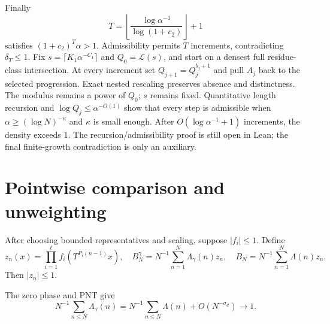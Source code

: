 Finally
\[
 T=\left\lfloor\frac{\log\alpha^{-1}}{\log(1+c_2)}\right\rfloor+1
\]
satisfies $(1+c_2)^T\alpha>1$. Admissibility permits $T$ increments, contradicting $\delta_T\leq1$.
\else
Fix $s=\lceil K_1\alpha^{-C_1}\rceil$ and $Q_0=\mathcal L(s)$, and start on a densest full residue-class intersection. At every increment set $Q_{j+1}=Q_j^{b_j+1}$ and pull $A_j$ back to the selected progression. Exact nested rescaling preserves absence and distinctness. The modulus remains a power of $Q_0$; $s$ remains fixed. Quantitative length recursion and $\log Q_j\leq\alpha^{-O(1)}$ show that every step is admissible when $\alpha\geq(\log N)^{-\kappa}$ and $\kappa$ is small enough. After $O(\log\alpha^{-1}+1)$ increments, the density exceeds $1$. The recursion/admissibility proof is still open in Lean; the final finite-growth contradiction is only an auxiliary.
\fi
{}

\section{Pointwise comparison and unweighting}
\begin{definition}\label{def:averages}
After choosing bounded representatives and scaling, suppose $|f_i|\leq1$. Define
\[
 z_n(x)=\prod_{i=1}^{\ell}f_i(T^{P_i(n-1)}x),\quad
 B_N^\gamma=N^{-1}\sum_{n=1}^N\Lambda_\gamma(n)z_n,\quad
 B_N=N^{-1}\sum_{n=1}^N\Lambda(n)z_n.
\]
Then $|z_n|\leq1$.
\end{definition}
The zero phase and PNT give
\[
 N^{-1}\sum_{n\leq N}\Lambda_\gamma(n)
 =N^{-1}\sum_{n\leq N}\Lambda(n)+O(N^{-\sigma_d})\longrightarrow1.
\]


